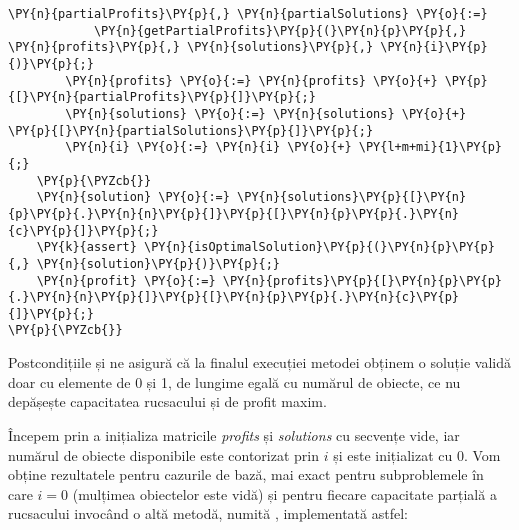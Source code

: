 \begin{sloppypar}
\begin{Verbatim}[commandchars=\\\{\}]
        \PY{n}{partialProfits}\PY{p}{,} \PY{n}{partialSolutions} \PY{o}{:=} 
            \PY{n}{getPartialProfits}\PY{p}{(}\PY{n}{p}\PY{p}{,} \PY{n}{profits}\PY{p}{,} \PY{n}{solutions}\PY{p}{,} \PY{n}{i}\PY{p}{)}\PY{p}{;}
        \PY{n}{profits} \PY{o}{:=} \PY{n}{profits} \PY{o}{+} \PY{p}{[}\PY{n}{partialProfits}\PY{p}{]}\PY{p}{;}
        \PY{n}{solutions} \PY{o}{:=} \PY{n}{solutions} \PY{o}{+} \PY{p}{[}\PY{n}{partialSolutions}\PY{p}{]}\PY{p}{;}
        \PY{n}{i} \PY{o}{:=} \PY{n}{i} \PY{o}{+} \PY{l+m+mi}{1}\PY{p}{;} 
    \PY{p}{\PYZcb{}}
    \PY{n}{solution} \PY{o}{:=} \PY{n}{solutions}\PY{p}{[}\PY{n}{p}\PY{p}{.}\PY{n}{n}\PY{p}{]}\PY{p}{[}\PY{n}{p}\PY{p}{.}\PY{n}{c}\PY{p}{]}\PY{p}{;}
    \PY{k}{assert} \PY{n}{isOptimalSolution}\PY{p}{(}\PY{n}{p}\PY{p}{,} \PY{n}{solution}\PY{p}{)}\PY{p}{;}
    \PY{n}{profit} \PY{o}{:=} \PY{n}{profits}\PY{p}{[}\PY{n}{p}\PY{p}{.}\PY{n}{n}\PY{p}{]}\PY{p}{[}\PY{n}{p}\PY{p}{.}\PY{n}{c}\PY{p}{]}\PY{p}{;}
\PY{p}{\PYZcb{}}
\end{Verbatim}
    \par Postcondițiile  și  ne asigură că la finalul execuției metodei obținem o soluție validă doar cu elemente de 0 și 1, de lungime egală cu numărul de obiecte, ce nu depășește capacitatea rucsacului și de profit maxim.
    \par Începem prin a inițializa matricile \textit{profits} și \textit{solutions} cu secvențe vide, iar numărul de obiecte disponibile este contorizat prin $i$ și este inițializat cu 0. Vom obține rezultatele pentru cazurile de bază, mai exact pentru subproblemele în care $i = 0$ (mulțimea obiectelor este vidă) și pentru fiecare capacitate parțială a rucsacului invocând o altă metodă, 
    numită , implementată astfel: 
    \begin{Verbatim}[commandchars=\\\{\}]
    

\end{Verbatim}
\end{sloppypar}
